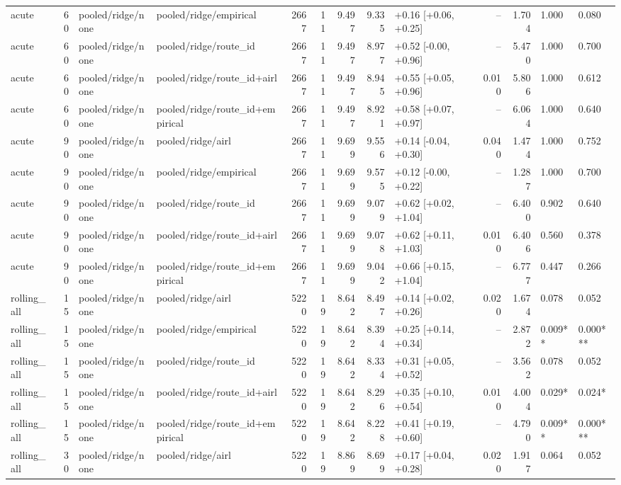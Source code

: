 \begin{tabular}{lrllrrrrlrrll}
acute & 60 & pooled/ridge/none & pooled/ridge/empirical & 2667 & 11 & 9.497 & 9.335 & +0.16 [+0.06, +0.25] & -- & 1.704 & 1.000 & 0.080 \\
acute & 60 & pooled/ridge/none & pooled/ridge/route_id & 2667 & 11 & 9.497 & 8.977 & +0.52 [-0.00, +0.96] & -- & 5.470 & 1.000 & 0.700 \\
acute & 60 & pooled/ridge/none & pooled/ridge/route_id+airl & 2667 & 11 & 9.497 & 8.945 & +0.55 [+0.05, +0.96] & 0.010 & 5.806 & 1.000 & 0.612 \\
acute & 60 & pooled/ridge/none & pooled/ridge/route_id+empirical & 2667 & 11 & 9.497 & 8.921 & +0.58 [+0.07, +0.97] & -- & 6.064 & 1.000 & 0.640 \\
acute & 90 & pooled/ridge/none & pooled/ridge/airl & 2667 & 11 & 9.699 & 9.556 & +0.14 [-0.04, +0.30] & 0.040 & 1.474 & 1.000 & 0.752 \\
acute & 90 & pooled/ridge/none & pooled/ridge/empirical & 2667 & 11 & 9.699 & 9.575 & +0.12 [-0.00, +0.22] & -- & 1.287 & 1.000 & 0.700 \\
acute & 90 & pooled/ridge/none & pooled/ridge/route_id & 2667 & 11 & 9.699 & 9.079 & +0.62 [+0.02, +1.04] & -- & 6.400 & 0.902 & 0.640 \\
acute & 90 & pooled/ridge/none & pooled/ridge/route_id+airl & 2667 & 11 & 9.699 & 9.078 & +0.62 [+0.11, +1.03] & 0.010 & 6.406 & 0.560 & 0.378 \\
acute & 90 & pooled/ridge/none & pooled/ridge/route_id+empirical & 2667 & 11 & 9.699 & 9.042 & +0.66 [+0.15, +1.04] & -- & 6.777 & 0.447 & 0.266 \\
rolling_all & 15 & pooled/ridge/none & pooled/ridge/airl & 5220 & 19 & 8.642 & 8.497 & +0.14 [+0.02, +0.26] & 0.020 & 1.674 & 0.078 & 0.052 \\
rolling_all & 15 & pooled/ridge/none & pooled/ridge/empirical & 5220 & 19 & 8.642 & 8.394 & +0.25 [+0.14, +0.34] & -- & 2.872 & 0.009** & 0.000*** \\
rolling_all & 15 & pooled/ridge/none & pooled/ridge/route_id & 5220 & 19 & 8.642 & 8.334 & +0.31 [+0.05, +0.52] & -- & 3.562 & 0.078 & 0.052 \\
rolling_all & 15 & pooled/ridge/none & pooled/ridge/route_id+airl & 5220 & 19 & 8.642 & 8.296 & +0.35 [+0.10, +0.54] & 0.010 & 4.004 & 0.029* & 0.024* \\
rolling_all & 15 & pooled/ridge/none & pooled/ridge/route_id+empirical & 5220 & 19 & 8.642 & 8.228 & +0.41 [+0.19, +0.60] & -- & 4.790 & 0.009** & 0.000*** \\
rolling_all & 30 & pooled/ridge/none & pooled/ridge/airl & 5220 & 19 & 8.869 & 8.699 & +0.17 [+0.04, +0.28] & 0.020 & 1.917 & 0.064 & 0.052 \\

\end{tabular}
